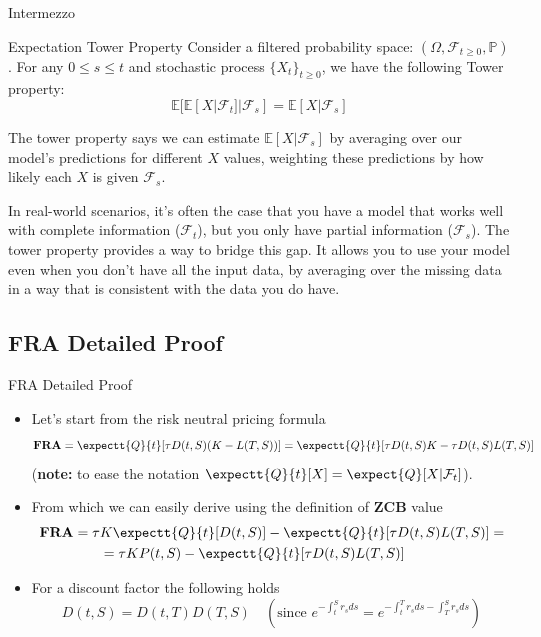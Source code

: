 \documentclass{beamer}
\begin{document}
\begin{frame}{Intermezzo}
\begin{block}{Expectation Tower Property}
Consider a filtered probability space: $(\Omega, \mathcal{F}_{t\geq 0}, \mathbb{P})$.
For any $0\leq s \leq t$ and stochastic process $\{X_t\}_{t\geq 0}$, we have the following Tower property:
\begin{equation}	
\mathbb{E}[\mathbb{E}[X|\mathcal{F}_t]|\mathcal{F}_s]=\mathbb{E}[X|\mathcal{F}_s]
\end{equation}
\end{block}

The tower property says we can estimate $\mathbb{E}[X|\mathcal{F}_s]$ by averaging over our model's predictions for different $X$ values, weighting these predictions by how likely each $X$ is given $\mathcal{F}_s$.

In real-world scenarios, it's often the case that you have a model that works well with complete information ($\mathcal{F}_t$), but you only have partial information ($\mathcal{F}_s$). The tower property provides a way to bridge this gap. It allows you to use your model even when you don't have all the input data, by averaging over the missing data in a way that is consistent with the data you do have.
\end{frame}

\subsection{FRA Detailed Proof}
\begin{frame}{FRA Detailed Proof}
\begin{itemize}
	\item<1-> Let's start from the risk neutral pricing formula
	\begin{equation} \textbf{FRA} = 
\expectt{Q}{t}[\tau D(t,S)(K - L(T,S))] = 	\expectt{Q}{t}[\tau D(t,S)K - \tau D(t,S)L(T,S)]
	\label{eq:fra_as_expectation}
	\end{equation}
	(\textbf{note:} to ease the notation $\expectt{Q}{t}[X] = \expect{Q}[X|\mathcal{F}_t]$).
	\item<2-> From which we can easily derive using the definition of \textbf{ZCB} value
	\begin{equation*}
		\begin{aligned}
		\textbf{FRA} = \tau &K\expectt{Q}{t}[D(t,S)] - \expectt{Q}{t}[\tau D(t,S)L(T,S)] = \\
		&=\tau KP(t,S) - \expectt{Q}{t}[\tau D(t,S)L(T,S)]
		\end{aligned}
	\end{equation*}
	\item<3-> For a discount factor the following holds
	\begin{equation*}
		D(t,S) = D(t,T)D(T,S)\quad(\text{since }e^{-\int_t^S r_s ds} = e^{-\int_t^T r_s ds - \int_T^S r_s ds}) 
	\end{equation*}
\end{itemize}
\end{frame}
\end{document}
